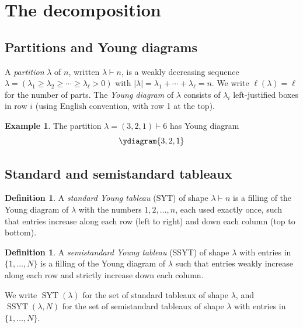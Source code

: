 \documentclass[12pt,a4paper]{article}
\theoremstyle{definition}
\newtheorem{definition}[theorem]{Definition}
\newtheorem{example}[theorem]{Example}
\theoremstyle{remark}
\newcommand{\SYT}{\operatorname{SYT}}
\newcommand{\SSYT}{\operatorname{SSYT}}
\begin{document}
\section{The decomposition}
\label{sec:decomposition}

\subsection{Partitions and Young diagrams}

A \emph{partition} $\lambda$ of $n$, written $\lambda \vdash n$, is a
weakly decreasing sequence $\lambda = (\lambda_1 \geqslant \lambda_2
\geqslant \cdots \geqslant \lambda_\ell > 0)$ with
$|\lambda| = \lambda_1 + \cdots + \lambda_\ell = n$. We write
$\ell(\lambda) = \ell$ for the number of parts. The \emph{Young diagram}
of $\lambda$ consists of $\lambda_i$ left-justified boxes in row $i$
(using English convention, with row 1 at the top).

\begin{example}
The partition $\lambda = (3,2,1) \vdash 6$ has Young diagram
\[
  \ydiagram{3,2,1}
\]
\end{example}

\subsection{Standard and semistandard tableaux}

\begin{definition}
A \emph{standard Young tableau} (SYT) of shape $\lambda \vdash n$ is a
filling of the Young diagram of $\lambda$ with the numbers $1, 2,
\ldots, n$, each used exactly once, such that entries increase along
each row (left to right) and down each column (top to bottom).
\end{definition}

\begin{definition}
A \emph{semistandard Young tableau} (SSYT) of shape $\lambda$ with
entries in $\{1, \ldots, N\}$ is a filling of the Young diagram of
$\lambda$ such that entries weakly increase along each row and
strictly increase down each column.
\end{definition}

We write $\SYT(\lambda)$ for the set of standard tableaux of shape
$\lambda$, and $\SSYT(\lambda, N)$ for the set of semistandard tableaux
of shape $\lambda$ with entries in $\{1, \ldots, N\}$.
\end{document}
